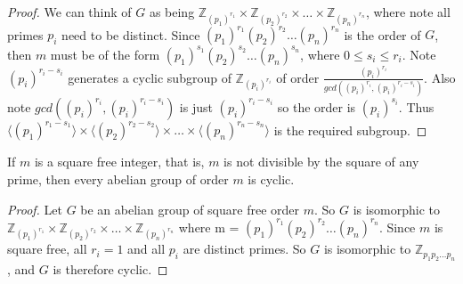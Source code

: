\documentclass[a4paper,8pt]{article}
\begin{document}
\begin{outline}
    \begin{proof}
      We can think of \(G\) as being \(\mathbb{Z}_{(p_{1})^{r_{1}}} \times \mathbb{Z}_{(p_{2})^{r_{2}}} \times
      \ldots \times \mathbb{Z}_{(p_{n})^{r_{n}}}\), where note all primes \(p_{i}\) need to be distinct. Since
      \((p_{1})^{r_{1}} (p_{2})^{r_{2}} \ldots (p_{n})^{r_{n}}\) is the order of \(G\), then \(m\) must be of the
      form \((p_{1})^{s_{1}} (p_{2})^{s_{2}} \ldots (p_{n})^{s_{n}}\), where \(0 \leq s_{i} \leq r_{i}\). Note
      \((p_{i})^{r_{i}-s_{i}}\) generates a cyclic subgroup of \(\mathbb{Z}_{(p_{i})^{r_{i}}}\) of order
      \(\frac{(p_{i})^{r_{i}}}{gcd((p_{i})^{r_{i}}, (p_{i})^{r_{i}-s_{i}})}\). Also note
      \(gcd((p_{i})^{r_{i}}, (p_{i})^{r_{i}-s_{i}})\) is just \((p_{i})^{r_{i}-s_{i}}\) so the order is
      \((p_{i})^{s_{i}}\). Thus \(\langle (p_{1})^{r_{1}-s_{1}} \rangle \times \langle (p_{2})^{r_{2}-s_{2}}
      \rangle \times \ldots \times \langle (p_{n})^{r_{n}-s_{n}} \rangle\) is the required subgroup.
    \end{proof}

    If \(m\) is a square free integer, that is, \(m\) is not divisible by the square of
    any prime, then every abelian group of order \(m\) is cyclic.

    \begin{proof}
      Let \(G\) be an abelian group of square free order \(m\). So \(G\) is isomorphic to
      \(\mathbb{Z}_{(p_{1})^{r_{1}}} \times \mathbb{Z}_{(p_{2})^{r_{2}}} \times \ldots \times
      \mathbb{Z}_{(p_{n})^{r_{n}}}\) where m = \((p_{1})^{r_{1}} (p_{2})^{r_{2}} \ldots (p_{n})^{r_{n}}\).
      Since \(m\) is square free, all \(r_{i} = 1\) and all \(p_{i}\) are distinct primes. So \(G\) is
      isomorphic to \(\mathbb{Z}_{p_{1} p_{2} \ldots p_{n}}\), and \(G\) is therefore cyclic.
    \end{proof}

\end{outline}
\end{document}
